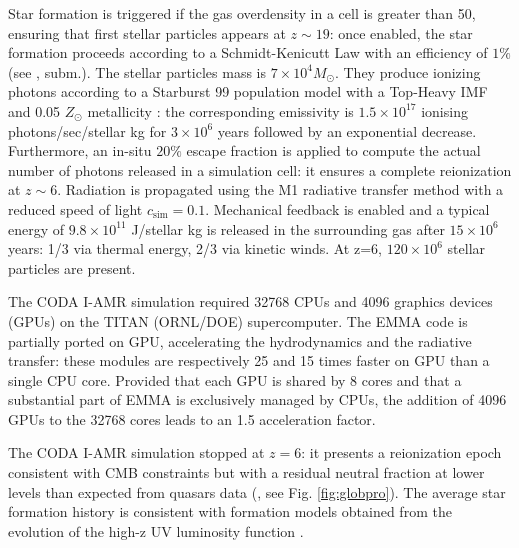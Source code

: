 \documentclass[twocolumn]{aastex61}
\newcommand{\dom}[1]{{#1}}
\begin{document}
Star formation is triggered if the gas overdensity in a cell is greater than 50, ensuring that first stellar particles appears at $z\sim 19$: once enabled, the star formation proceeds according to a Schmidt-Kenicutt Law with an efficiency of $1\%$ (see \citet{RAS06},\citet{DEP17} subm.). The stellar particles mass is  $7\times 10^4 M_\odot$. They produce ionizing photons according to a Starburst 99 population model \citep{LEI99} with a Top-Heavy IMF and 0.05 $Z_\odot$ metallicity : the corresponding emissivity is $1.5\times 10^{17}$ ionising photons/sec/stellar kg for $3\times 10^6$ years followed by an exponential decrease. Furthermore, an in-situ $20\%$ escape fraction is applied to compute the actual number of photons released in a simulation cell: it ensures a complete reionization at $z\sim 6$.  \dom{Radiation is propagated using the M1 radiative transfer method with a reduced speed of light $c_\mathrm{sim}=0.1$}. Mechanical feedback is enabled and a typical energy of $9.8\times 10^{11}$ J/stellar kg is released in the surrounding gas after $15\times 10^6$ years: 1/3 via thermal energy, 2/3 via kinetic winds. At z=6, $120\times 10^6$ stellar particles are present.

The CODA I-AMR simulation required 32768 CPUs and 4096 graphics devices (GPUs) on the TITAN (ORNL/DOE) supercomputer. The EMMA code is partially ported on GPU, accelerating the hydrodynamics and the radiative transfer: these modules are respectively 25 and 15 times faster on GPU than a single CPU core. Provided that each GPU is shared by 8 cores and that a substantial part of EMMA is exclusively managed by CPUs, the addition of 4096 GPUs to the 32768 cores leads to an 1.5 acceleration factor. 


The CODA I-AMR simulation stopped at $z=6$: it presents a reionization epoch consistent with CMB constraints \citep{PLA15} but with a residual neutral fraction at lower levels than expected from quasars data (\citet{FAN6}, see Fig. \ref{fig:globpro}). The average star formation history is consistent with formation models obtained from the evolution of the high-z UV luminosity function \citep{BOU14,FIN15}.  
\end{document}
